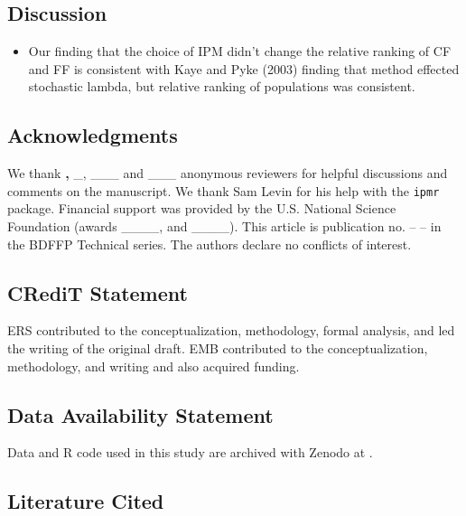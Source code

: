\documentclass[
  12pt,
]{article}
\providecommand{\tightlist}{%
  \setlength{\itemsep}{0pt}\setlength{\parskip}{0pt}}\usepackage{longtable,booktabs,array}
\begin{document}
\hypertarget{discussion}{%
\subsection{Discussion}\label{discussion}}

\begin{itemize}
\tightlist
\item
  Our finding that the choice of IPM didn't change the relative ranking
  of CF and FF is consistent with Kaye and Pyke (2003) finding that
  method effected stochastic lambda, but relative ranking of populations
  was consistent.
\end{itemize}

\hypertarget{acknowledgments}{%
\subsection{Acknowledgments}\label{acknowledgments}}

We thank \textbf{,} \_, \_\_\_ and \_\_\_ anonymous reviewers for
helpful discussions and comments on the manuscript. We thank Sam Levin
for his help with the \texttt{ipmr} package. Financial support was
provided by the U.S. National Science Foundation (awards \_\_\_\_, and
\_\_\_\_). This article is publication no. -- -- in the BDFFP Technical
series. The authors declare no conflicts of interest.

\hypertarget{credit-statement}{%
\subsection{CRediT Statement}\label{credit-statement}}

ERS contributed to the conceptualization, methodology, formal analysis,
and led the writing of the original draft. EMB contributed to the
conceptualization, methodology, and writing and also acquired funding.

\hypertarget{data-availability-statement}{%
\subsection{Data Availability
Statement}\label{data-availability-statement}}

Data and R code used in this study are archived with Zenodo at .

\hypertarget{literature-cited}{%
\subsection{Literature Cited}\label{literature-cited}}
\end{document}
